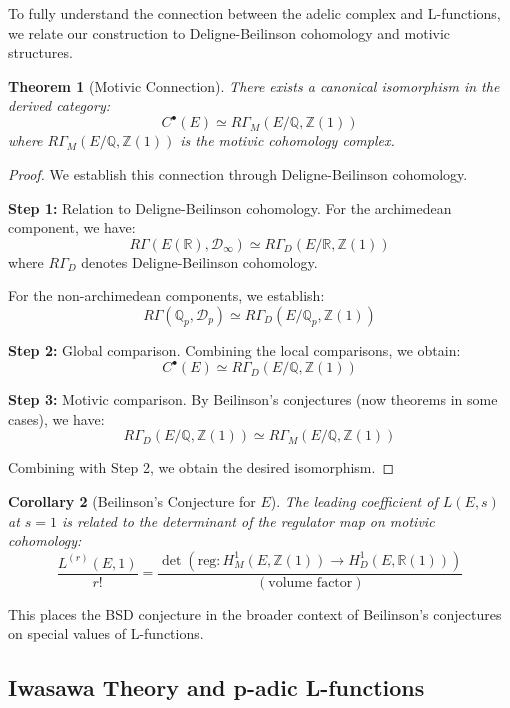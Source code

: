 \documentclass{article}
\theoremstyle{plain}
\newtheorem{theorem}{Theorem}[section]
\newtheorem{corollary}[theorem]{Corollary}
\theoremstyle{definition}
\theoremstyle{remark}
\begin{document}
To fully understand the connection between the adelic complex and L-functions, we relate our construction to Deligne-Beilinson cohomology and motivic structures.

\begin{theorem}[Motivic Connection]
There exists a canonical isomorphism in the derived category:
\[
C^\bullet(E) \simeq R\Gamma_M(E/\mathbb{Q}, \mathbb{Z}(1))
\]
where $R\Gamma_M(E/\mathbb{Q}, \mathbb{Z}(1))$ is the motivic cohomology complex.
\end{theorem}

\begin{proof}
We establish this connection through Deligne-Beilinson cohomology.
\vspace{.3cm} 

\textbf{Step 1:} Relation to Deligne-Beilinson cohomology.
For the archimedean component, we have:
\[
R\Gamma(E(\mathbb{R}), \mathcal{D}_\infty) \simeq R\Gamma_D(E/\mathbb{R}, \mathbb{Z}(1))
\]
where $R\Gamma_D$ denotes Deligne-Beilinson cohomology.
\vspace{.3cm} 

For the non-archimedean components, we establish:
\[
R\Gamma(\mathbb{Q}_p, \mathcal{D}_p) \simeq R\Gamma_D(E/\mathbb{Q}_p, \mathbb{Z}(1))
\]

\textbf{Step 2:} Global comparison.
Combining the local comparisons, we obtain:
\[
C^\bullet(E) \simeq R\Gamma_D(E/\mathbb{Q}, \mathbb{Z}(1))
\]

\textbf{Step 3:} Motivic comparison.
By Beilinson's conjectures (now theorems in some cases), we have:
\[
R\Gamma_D(E/\mathbb{Q}, \mathbb{Z}(1)) \simeq R\Gamma_M(E/\mathbb{Q}, \mathbb{Z}(1))
\]

Combining with Step 2, we obtain the desired isomorphism.
\end{proof}

\begin{corollary}[Beilinson's Conjecture for $E$]
The leading coefficient of $L(E, s)$ at $s = 1$ is related to the determinant of the regulator map on motivic cohomology:
\[
\frac{L^{(r)}(E, 1)}{r!} = \frac{\det(\text{reg} : H^1_M(E, \mathbb{Z}(1)) \to H^1_D(E, \mathbb{R}(1)))}{(\text{volume factor})}
\]
\end{corollary}

This places the BSD conjecture in the broader context of Beilinson's conjectures on special values of L-functions.

\subsection{Iwasawa Theory and p-adic L-functions}
\end{document}
